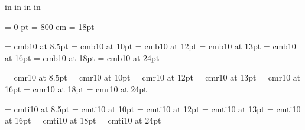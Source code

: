 
 in     %
 in    %
 in  %
 in  %

\nopagenumbers

\parindent = 0 pt
\emergencystretch = 800 em
\baselineskip = 18pt

\font\FFba=      cmb10            at 8.5pt
\font\FFbb=      cmb10            at 10pt
\font\FFbc=      cmb10            at 12pt
\font\FFbd=      cmb10            at 13pt
\font\FFbe=      cmb10            at 16pt
\font\FFbf=      cmb10            at 18pt
\font\FFbg=      cmb10            at 24pt

\font\FFra=      cmr10            at 8.5pt
\font\FFrb=      cmr10            at 10pt
\font\FFrc=      cmr10            at 12pt
\font\FFrd=      cmr10            at 13pt
\font\FFre=      cmr10            at 16pt
\font\FFrf=      cmr10            at 18pt
\font\FFrg=      cmr10            at 24pt

\font\FFta=      cmti10           at 8.5pt
\font\FFtb=      cmti10           at 10pt
\font\FFtc=      cmti10           at 12pt
\font\FFtd=      cmti10           at 13pt
\font\FFte=      cmti10           at 16pt
\font\FFtf=      cmti10           at 18pt
\font\FFtg=      cmti10           at 24pt

\FFrd


